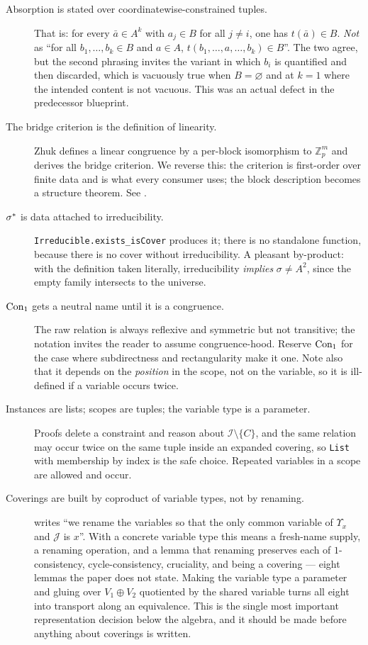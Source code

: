 \begin{description}
\item[Absorption is stated over coordinatewise-constrained tuples.]
  That is: for every $\bar a\in A^{k}$ with $a_{j}\in B$ for all $j\neq i$, one
  has $t(\bar a)\in B$. \emph{Not} as ``for all
  $b_{1},\dots,b_{k}\in B$ and $a\in A$, $t(b_{1},\dots,a,\dots,b_{k})\in B$''.
  The two agree, but the second phrasing
  invites the variant in which $b_{i}$ is quantified and then discarded, which
  is vacuously true when $B=\varnothing$ and at $k=1$ where the intended
  content is not vacuous. This was an actual defect in the predecessor
  blueprint.

\item[The bridge criterion is the definition of linearity.]
  Zhuk defines a linear congruence by a per-block isomorphism to
  $\mathbb Z_{p}^{m}$ and derives the bridge criterion. We reverse this: the
  criterion is first-order over finite data and is what every consumer uses;
  the block description becomes a structure theorem. See
  .

\item[$\sigma^{*}$ is data attached to irreducibility.]
  \texttt{Irreducible.exists\_isCover} produces it; there is no standalone
  function, because there is no cover without irreducibility. A pleasant
  by-product: with the definition taken literally, irreducibility \emph{implies}
  $\sigma\neq A^{2}$, since the empty family intersects to the universe.

\item[$\operatorname{Con}_1$ gets a neutral name until it is a congruence.]
  The raw relation is always reflexive and symmetric but not transitive; the
  notation invites the reader to assume congruence-hood. Reserve $\operatorname{Con}_1$ for
  the case where subdirectness and rectangularity make it one. Note also that
  it depends on the \emph{position} in the scope, not on the variable, so it is
  ill-defined if a variable occurs twice.

\item[Instances are lists; scopes are tuples; the variable type is a parameter.]
  Proofs delete a constraint and reason about $\mathcal I\setminus\{C\}$, and
  the same relation may occur twice on the same tuple inside an expanded
  covering, so \texttt{List} with membership by index is the safe choice.
  Repeated variables in a scope are allowed and occur.

\item[Coverings are built by coproduct of variable types, not by renaming.]
  \cite{ZhukSimplified} writes ``we rename the variables so that the only
  common variable of $\Upsilon_{x}$ and $\mathcal J$ is $x$''. With a concrete
  variable type this means a fresh-name supply, a renaming operation, and a
  lemma that renaming preserves each of $1$-consistency, cycle-consistency,
  cruciality, and being a covering --- eight lemmas the paper does not state.
  Making the variable type a parameter and gluing over $V_{1}\oplus V_{2}$
  quotiented by the shared variable turns all eight into transport along an
  equivalence. This is the single most important representation decision below
  the algebra, and it should be made before anything about coverings is
  written.


\end{description}
